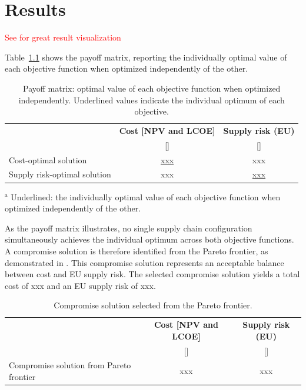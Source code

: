 \chapter{Results}
\label{chap_results}

\textcolor{red}{See \cite{farajiamiriMultiobjectiveOptimizationRenewable2023} for great result visualization}

Table~\ref{tab:payoff_matrix} shows the payoff matrix, reporting the individually optimal value of each objective function when optimized independently of the other.

\begin{table}[h!]
    \centering
    \caption{Payoff matrix: optimal value of each objective function when optimized independently. Underlined values indicate the individual optimum of each objective.}
    \begin{tabular}{lcc}
        \hline
         & \textbf{Cost [NPV and LCOE]} & \textbf{Supply risk (EU)} \\
         & []                           & [] \\
        \hline
        Cost-optimal solution        & \underline{xxx} & xxx \\
        Supply risk-optimal solution & xxx & \underline{xxx} \\
        \hline
    \end{tabular}
    \label{tab:payoff_matrix}
    \vspace{2pt}
    \begin{minipage}{\linewidth}
        \footnotesize $^{\mathrm{a}}$ Underlined: the individually optimal value of each objective function when optimized independently of the other.
    \end{minipage}
\end{table}

As the payoff matrix illustrates, no single supply chain configuration simultaneously achieves the individual optimum across both objective functions. A compromise solution is therefore identified from the Pareto frontier, as demonstrated in \textcite{farajiamiriMultiobjectiveOptimizationRenewable2023}. This compromise solution represents an acceptable balance between cost and EU supply risk. The selected compromise solution yields a total cost of xxx and an EU supply risk of xxx.

\begin{table}[h!]
    \centering
    \caption{Compromise solution selected from the Pareto frontier.}
    \begin{tabular}{lcc}
        \hline
         & \textbf{Cost [NPV and LCOE]} & \textbf{Supply risk (EU)} \\
         & []                           & [] \\
        \hline
        Compromise solution from Pareto frontier & xxx & xxx \\
        \hline
    \end{tabular}
    \label{tab:compromise_solution}
\end{table}
